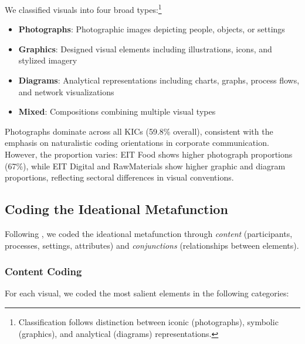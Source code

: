 \documentclass[../main.tex]{subfiles}
\begin{document}
We classified visuals into four broad types:\footnote{Classification follows \cite{kress2006reading} distinction between iconic (photographs), symbolic (graphics), and analytical (diagrams) representations.}

\begin{itemize}
    \item \textbf{Photographs}: Photographic images depicting people, objects, or settings
    \item \textbf{Graphics}: Designed visual elements including illustrations, icons, and stylized imagery
    \item \textbf{Diagrams}: Analytical representations including charts, graphs, process flows, and network visualizations
    \item \textbf{Mixed}: Compositions combining multiple visual types
\end{itemize}

Photographs dominate across all KICs (59.8\% overall), consistent with the emphasis on naturalistic coding orientations in corporate communication. However, the proportion varies: EIT Food shows higher photograph proportions (67\%), while EIT Digital and RawMaterials show higher graphic and diagram proportions, reflecting sectoral differences in visual conventions.

\subsection{Coding the Ideational Metafunction}

Following \cite{jancsary2018institutions}, we coded the ideational metafunction through \textit{content} (participants, processes, settings, attributes) and \textit{conjunctions} (relationships between elements).

\subsubsection{Content Coding}

For each visual, we coded the most salient elements in the following categories:
\end{document}

